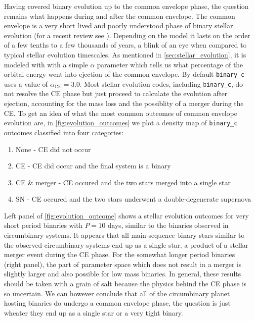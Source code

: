 \documentclass[ twoside,openright,titlepage,numbers=noenddot,headinclude,%
                footinclude=true,cleardoublepage=empty,abstractoff, %
                BCOR=5mm,paper=a4,fontsize=11pt,%
                american,%
                ]{scrreprt}
\begin{document}
Having covered binary evolution up to the common envelope phase, the question
remains what happens during and after the common envelope.
The common envelope is a very short lived and poorly understood phase of 
binary stellar evolution (for a recent review see \cite{Ivanova2013}). 
Depending on the model it lasts on the order of a few
tenths to a few thousands of years, a blink of an eye when compared to 
typical stellar evolution timescales. 
As mentioned in \cref{sec:stellar_evolution}, it is modeled with 
with a simple $\alpha$ parameter which tells us what percentage of the orbital 
energy went into ejection of the common envelope. By default 
\texttt{binary\_c} uses a value of $\alpha_\text{CE}=3.0$. Most stellar evolution codes,
including \texttt{binary\_c}, do not resolve the CE phase but just proceed to
calculate the evolution after ejection, accounting for the mass loss and the 
possiblity of a merger during the CE. To get an idea of what the most common outcomes
of common envelope evolution are, in \cref{fig:evolution_outcomes} we plot a density 
map of \texttt{binary\_c} outcomes classified into four categories:
\begin{enumerate}
    \item None - CE did not occur
    \item CE - CE did occur and the final system is a binary
    \item CE \& merger - CE occured and the two stars merged into a single star
    \item SN - CE occured and the two stars underwent a double-degenerate supernova
\end{enumerate}
Left panel of \cref{fig:evolution_outcome} shows a stellar evolution 
outcomes for very short period binaries with
$P=10$ days, similar to the binaries observed in circumbinary systems.  
It appears that all main-sequence
binary stars similar to the observed circumbinary systems end up as a single star, a 
product of a stellar merger event during the CE phase. 
For the somewhat longer period binaries (right panel), the part of parameter space
which does not result in a merger is slightly larger and also possible for low 
mass binaries. In general, these results should be taken with a grain of salt 
because the physics behind the CE phase is so uncertain. We can however conclude
that all of the circumbinary planet hosting binaries do undergo a common envelope
phase, the question is just wheater they end up as a single star or a very tight 
binary.
\end{document}
